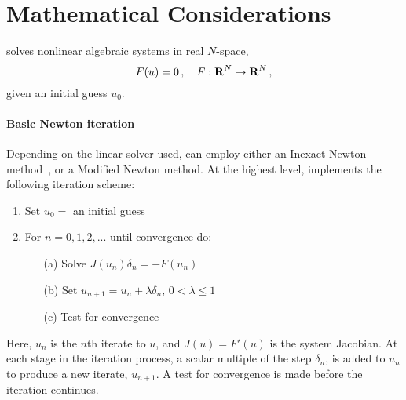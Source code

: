 \chapter{Mathematical Considerations}\label{s:math}

{\kinsol} solves nonlinear algebraic systems in real $N$-space,
\begin{equation}\label{nonlinear_system}
  F(u) = 0 \, , \quad F:\mbox{\bf R}^N \rightarrow \mbox{\bf R}^N \, ,
\end{equation}
given an initial guess $u_0$.


\subsubsection*{Basic Newton iteration}
Depending on the linear solver used, {\kinsol} can employ either an Inexact Newton 
method~\cite{Bro:87,BrSa:90,DES:82,DeSc:96,Kel:95}, or a Modified Newton method.
At the highest level, {\kinsol} implements the following iteration scheme:

\vspace{1ex}
\begin{enumerate}
   \item Set $u_0 = $ an initial guess
   \item For $n = 0, 1, 2,...$ until convergence do:
      \begin{itemize}
          \item[(a)] Solve $J(u_n)\delta_n = -F(u_n)$ \label{e:Newton}
          \item[(b)] Set $u_{n+1} = u_n + \lambda \delta_n$,
          $0 < \lambda \leq 1$
          \item[(c)] Test for convergence
      \end{itemize}
\end{enumerate}
Here, $u_n$ is the $n$th iterate to $u$, and $J(u) = F'(u)$ is the system
Jacobian. At each stage in the iteration process, a scalar multiple of the
step $\delta_n$, is added to $u_n$ to produce a new iterate, $u_{n+1}$.
A test for convergence is made before the iteration continues.



